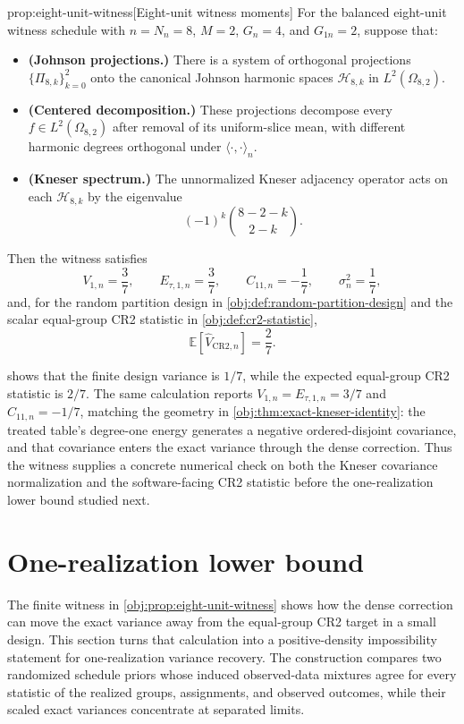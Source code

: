 \documentclass[11pt]{article}
\begin{document}
\begin{propositionv}{prop:eight-unit-witness}[Eight-unit witness moments]
For the balanced eight-unit witness schedule with \(n=N_n=8\), \(M=2\), \(G_n=4\), and \(G_{1n}=2\), suppose that:
\begin{itemize}
\item \textbf{(Johnson projections.)} There is a system of orthogonal projections \(\{\Pi_{8,k}\}_{k=0}^2\) onto the canonical Johnson harmonic spaces \(\mathcal H_{8,k}\) in \(L^2(\Omega_{8,2})\).
\item \textbf{(Centered decomposition.)} These projections decompose every \(f\in L^2(\Omega_{8,2})\) after removal of its uniform-slice mean, with different harmonic degrees orthogonal under \(\langle\cdot,\cdot\rangle_n\).
\item \textbf{(Kneser spectrum.)} The unnormalized Kneser adjacency operator acts on each \(\mathcal H_{8,k}\) by the eigenvalue
\[
(-1)^k {8-2-k \choose 2-k}.
\]
\end{itemize}
Then the witness satisfies
\[
V_{1,n}=\frac{3}{7},\qquad
E_{\tau,1,n}=\frac{3}{7},\qquad
C_{11,n}=-\frac{1}{7},\qquad
\sigma_n^2=\frac{1}{7},
\]
and, for the random partition design in \cref{obj:def:random-partition-design} and the scalar equal-group CR2 statistic in \cref{obj:def:cr2-statistic},
\[
\mathbb E\!\left[\widehat V_{\mathrm{CR2},n}\right]=\frac{2}{7}.
\]
\end{propositionv}

 shows that the finite design variance is \(1/7\), while the expected equal-group CR2 statistic is \(2/7\). The same calculation reports \(V_{1,n}=E_{\tau,1,n}=3/7\) and \(C_{11,n}=-1/7\), matching the geometry in \cref{obj:thm:exact-kneser-identity}: the treated table's degree-one energy generates a negative ordered-disjoint covariance, and that covariance enters the exact variance through the dense correction. Thus the witness supplies a concrete numerical check on both the Kneser covariance normalization and the software-facing CR2 statistic before the one-realization lower bound studied next.


\section{One-realization lower bound}\label{sec:lower-bound}

The finite witness in \cref{obj:prop:eight-unit-witness} shows how the dense correction can move the exact variance away from the equal-group CR2 target in a small design. This section turns that calculation into a positive-density impossibility statement for one-realization variance recovery. The construction compares two randomized schedule priors whose induced observed-data mixtures agree for every statistic of the realized groups, assignments, and observed outcomes, while their scaled exact variances concentrate at separated limits.
\end{document}
